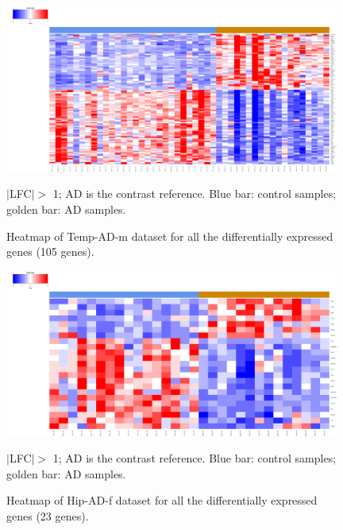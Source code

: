 \begin{figure}[!ht]
    \centerline{\includegraphics[width = 11cm]{Figures/DE heatmap/CTLvsAD-TCx-m_105.png}}
\caption{Heatmap of Temp-AD-m dataset for all the differentially expressed genes (105 genes).}
\label{DE-temp-ad-m}
\footnotesize $|$LFC$| >$ 1; AD is the contrast reference. Blue bar: control samples; golden bar: AD samples.
\end{figure}


\begin{figure}[!ht]
    \centerline{\includegraphics[width = 11cm]{Figures/DE heatmap/CTLvsAD-HIP-f_23.png}}
\caption{Heatmap of Hip-AD-f dataset for all the differentially expressed genes (23 genes).}
\label{DE-hip-ad-f}
\footnotesize $|$LFC$| >$ 1; AD is the contrast reference. Blue bar: control samples; golden bar: AD samples.
\end{figure}


